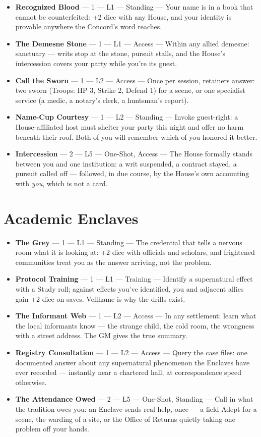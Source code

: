 \begin{itemize}
    \item \textbf{Recognized Blood} --- 1 --- L1 --- Standing --- Your name is in a book that cannot be counterfeited: +2 dice with any House, and your identity is provable anywhere the Concord's word reaches.
    \item \textbf{The Demesne Stone} --- 1 --- L1 --- Access --- Within any allied demesne: sanctuary --- writs stop at the stone, pursuit stalls, and the House's intercession covers your party while you're its guest.
    \item \textbf{Call the Sworn} --- 1 --- L2 --- Access --- Once per session, retainers answer: two sworn (Troops: HP 3, Strike 2, Defend 1) for a scene, or one specialist service (a medic, a notary's clerk, a huntsman's report).
    \item \textbf{Name-Cup Courtesy} --- 1 --- L2 --- Standing --- Invoke guest-right: a House-affiliated host must shelter your party this night and offer no harm beneath their roof. Both of you will remember which of you honored it better.
    \item \textbf{Intercession} --- 2 --- L5 --- One-Shot, Access --- The House formally stands between you and one institution: a writ suspended, a contract stayed, a pursuit called off --- followed, in due course, by the House's own accounting with \textit{you}, which is not a card.
\end{itemize}

\section{Academic Enclaves}

\begin{itemize}
    \item \textbf{The Grey} --- 1 --- L1 --- Standing --- The credential that tells a nervous room what it is looking at: +2 dice with officials and scholars, and frightened communities treat you as the answer arriving, not the problem.
    \item \textbf{Protocol Training} --- 1 --- L1 --- Training --- Identify a supernatural effect with a Study roll; against effects you've identified, you and adjacent allies gain +2 dice on saves. Vellhame is why the drills exist.
    \item \textbf{The Informant Web} --- 1 --- L2 --- Access --- In any settlement: learn what the local informants know --- the strange child, the cold room, the wrongness with a street address. The GM gives the true summary.
    \item \textbf{Registry Consultation} --- 1 --- L2 --- Access --- Query the case files: one documented answer about any supernatural phenomenon the Enclaves have ever recorded --- instantly near a chartered hall, at correspondence speed otherwise.
    \item \textbf{The Attendance Owed} --- 2 --- L5 --- One-Shot, Standing --- Call in what the tradition owes you: an Enclave sends real help, once --- a field Adept for a scene, the warding of a site, or the Office of Returns quietly taking one problem off your hands.
\end{itemize}

